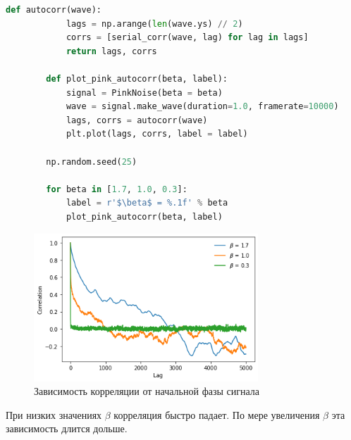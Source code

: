\documentclass[a4paper, 12pt]{report}
\begin{document}
	\begin{lstlisting}[language=Python,caption=Функция автокорреляции для Розового шума]
		def autocorr(wave):
			lags = np.arange(len(wave.ys) // 2)
			corrs = [serial_corr(wave, lag) for lag in lags]
			return lags, corrs
		
		def plot_pink_autocorr(beta, label):
			signal = PinkNoise(beta = beta)
			wave = signal.make_wave(duration=1.0, framerate=10000)
			lags, corrs = autocorr(wave)
			plt.plot(lags, corrs, label = label)

		np.random.seed(25)

		for beta in [1.7, 1.0, 0.3]:
			label = r'$\beta$ = %.1f' % beta
			plot_pink_autocorr(beta, label)
	\end{lstlisting}
	\begin{figure}[H]
		\centering
		\includegraphics[width=0.75\textwidth]{beta2.png}
		\caption{Зависимость корреляции от начальной фазы сигнала}
		\label{fig:beta2}
	\end{figure}
	При низких значениях $\beta$ корреляция быстро падает. По мере увеличения $\beta$ эта зависимость длится дольше.
\end{document}
